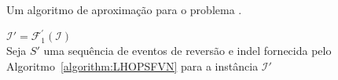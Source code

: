 \begin{algorithm}[!tbh]
  \caption{Um algoritmo de aproximação para o problema \SbFIRI{}.\label{algorithm:ODSKKWNP}}
  $\mathcal{I}' = \mathcal{F}_{1}^{'}(\mathcal{I})$ \\
  Seja $S'$ uma sequência de eventos de reversão e indel fornecida pelo Algoritmo~\ref{algorithm:LHOPSFVN} para a instância $\mathcal{I}'$ \\
\end{algorithm}